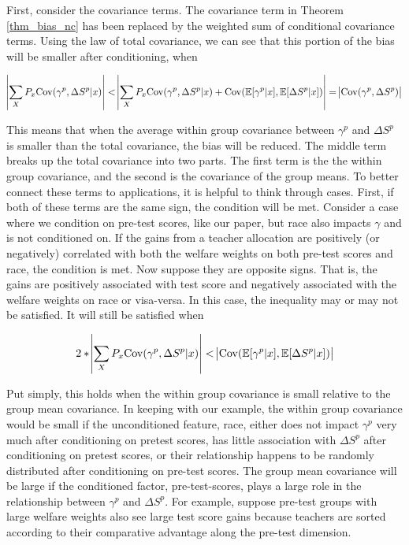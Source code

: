 \documentclass[12pt]{article}
\theoremstyle{definition}
\theoremstyle{definition}
\theoremstyle{definition}
\theoremstyle{definition}
\begin{document}
    First, consider the covariance terms. The covariance term in Theorem \ref{thm_bias_nc} has been replaced by the weighted sum of conditional covariance terms. Using the law of total covariance, we can see that this portion of the bias will be smaller after conditioning, when 
    
       \begin{equation}
         \abs{ \sum_{X} P_x \mathrm{Cov}(\gamma^p, \Delta S^p| x) }  < \abs{ \sum_{X} P_x \mathrm{Cov}(\gamma^p, \Delta S^p| x) + \mathrm{Cov}(\mathbb{E}[\gamma^p|x], \mathbb{E}[\Delta S^p|x]) } =   \abs{ \mathrm{Cov}(\gamma^p, \Delta S^p) }
        \end{equation}


    This means that when the average within group covariance between $\gamma^p$ and $ \Delta S^p$ is smaller than the total covariance, the bias will be reduced. The middle term breaks up the total covariance into two parts. The first term is the the within group covariance, and the second is the covariance of the group means. To better connect these terms to applications, it is helpful to think through cases. First, if both of these terms are the same sign, the condition will be met. Consider a case where we condition on pre-test scores, like our paper, but race also impacts $\gamma$ and is not conditioned on. If the gains from a teacher allocation are positively (or negatively) correlated with both the welfare weights on both pre-test scores and race, the condition is met. Now suppose they are opposite signs. That is, the gains are positively associated with test score and negatively associated with the welfare weights on race or visa-versa. In this case, the inequality may or may not be satisfied. It will still be satisfied when 

         \begin{equation}
         2 * \abs{ \sum_{X} P_x \mathrm{Cov}(\gamma^p, \Delta S^p| x)} < \abs{ \mathrm{Cov}(\mathbb{E}[\gamma^p|x], \mathbb{E}[\Delta S^p|x]) }
        \end{equation}

   Put simply, this holds when the within group covariance is small relative to the group mean covariance. In keeping with our example, the within group covariance would be small if the unconditioned feature, race, either does not impact $\gamma^p$ very much after conditioning on pretest scores, has little association with $\Delta S^p$ after conditioning on pretest scores, or their relationship happens to be randomly distributed after conditioning on pre-test scores. The group mean covariance will be large if the conditioned factor, pre-test-scores, plays a large role in the relationship between $\gamma^p$ and $\Delta S^p$. For example, suppose pre-test groups with large welfare weights also see large test score gains because teachers are sorted according to their comparative advantage along the pre-test dimension. 
\end{document}
